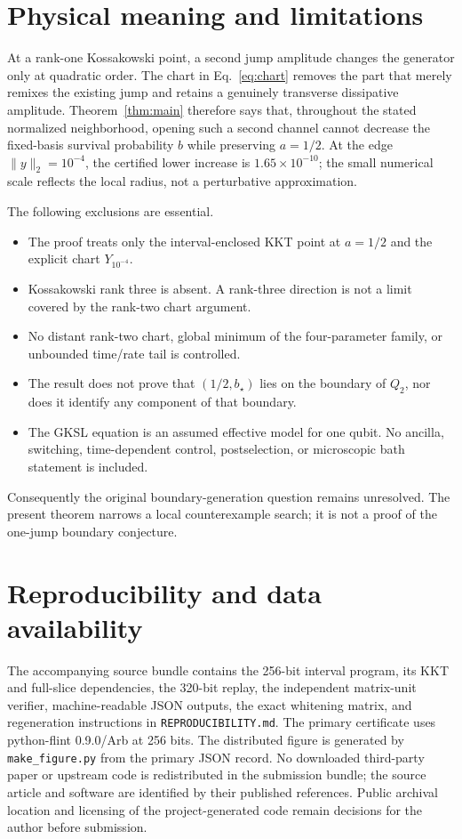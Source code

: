 \documentclass[11pt,a4paper]{article}
\begin{document}
\section{Physical meaning and limitations}
\label{sec:limits}

At a rank-one Kossakowski point, a second jump amplitude changes the generator
only at quadratic order.  The chart in Eq.~\eqref{eq:chart} removes the part
that merely remixes the existing jump and retains a genuinely transverse
dissipative amplitude.  Theorem~\ref{thm:main} therefore says that, throughout
the stated normalized neighborhood, opening such a second channel cannot
decrease the fixed-basis survival probability $b$ while preserving
$a=1/2$.  At the edge $\lVert y\rVert_2=10^{-4}$, the certified lower increase
is $1.65\times10^{-10}$; the small numerical scale reflects the local radius,
not a perturbative approximation.

The following exclusions are essential.
\begin{itemize}
 \item The proof treats only the interval-enclosed KKT point at $a=1/2$ and
 the explicit chart $Y_{10^{-4}}$.
 \item Kossakowski rank three is absent.  A rank-three direction is not a
 limit covered by the rank-two chart argument.
 \item No distant rank-two chart, global minimum of the four-parameter
 family, or unbounded time/rate tail is controlled.
 \item The result does not prove that $(1/2,b_\star)$ lies on the boundary of
 $Q_2$, nor does it identify any component of that boundary.
 \item The GKSL equation is an assumed effective model for one qubit.  No
 ancilla, switching, time-dependent control, postselection, or microscopic
 bath statement is included.
\end{itemize}
Consequently the original boundary-generation question remains unresolved.
The present theorem narrows a local counterexample search; it is not a proof
of the one-jump boundary conjecture.

\section{Reproducibility and data availability}

The accompanying source bundle contains the 256-bit interval program, its
KKT and full-slice dependencies, the 320-bit replay, the independent
matrix-unit verifier, machine-readable JSON outputs, the exact whitening
matrix, and regeneration instructions in \texttt{REPRODUCIBILITY.md}.  The
primary certificate uses python-flint 0.9.0/Arb at 256 bits.  The distributed
figure is generated by \texttt{make\_figure.py} from the primary JSON record.
No downloaded third-party paper or upstream code is redistributed in the
submission bundle; the source article and software are identified by their
published references.  Public archival location and licensing of the
project-generated code remain decisions for the author before submission.
\end{document}

